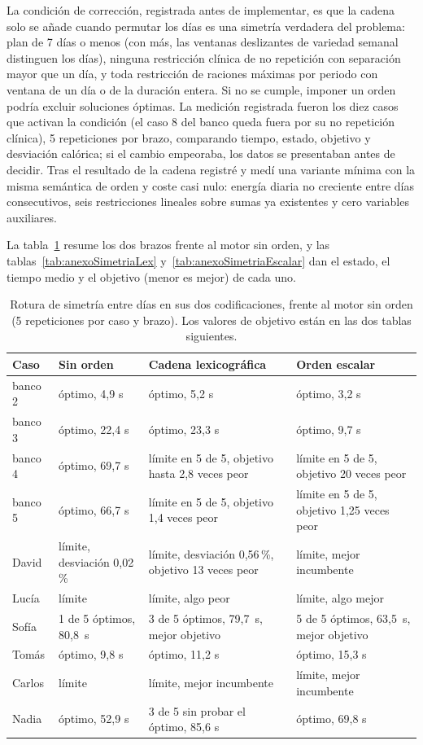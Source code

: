La condición de corrección, registrada antes de implementar, es que la cadena solo se añade cuando permutar los días es una simetría verdadera del problema: plan de 7 días o menos (con más, las ventanas deslizantes de variedad semanal distinguen los días), ninguna restricción clínica de no repetición con separación mayor que un día, y toda restricción de raciones máximas por periodo con ventana de un día o de la duración entera. Si no se cumple, imponer un orden podría excluir soluciones óptimas. La medición registrada fueron los diez casos que activan la condición (el caso 8 del banco queda fuera por su no repetición clínica), 5 repeticiones por brazo, comparando tiempo, estado, objetivo y desviación calórica; si el cambio empeoraba, los datos se presentaban antes de decidir. Tras el resultado de la cadena registré y medí una variante mínima con la misma semántica de orden y coste casi nulo: energía diaria no creciente entre días consecutivos, seis restricciones lineales sobre sumas ya existentes y cero variables auxiliares.

La tabla~\ref{tab:simetria} resume los dos brazos frente al motor sin orden, y las tablas~\ref{tab:anexoSimetriaLex} y~\ref{tab:anexoSimetriaEscalar} dan el estado, el tiempo medio y el objetivo (menor es mejor) de cada uno.

\begin{table}[htbp]
\centering
\footnotesize
\begin{tabular}{|p{1.4cm}|p{3cm}|p{4.1cm}|p{4.1cm}|}
\hline
\textbf{Caso} & \textbf{Sin orden} & \textbf{Cadena lexicográfica} & \textbf{Orden escalar} \\
\hline
banco 2 & óptimo, 4,9 s & óptimo, 5,2 s & óptimo, 3,2 s \\
\hline
banco 3 & óptimo, 22,4 s & óptimo, 23,3 s & óptimo, 9,7 s \\
\hline
banco 4 & óptimo, 69,7 s & límite en 5 de 5, objetivo hasta 2,8 veces peor & límite en 5 de 5, objetivo 20 veces peor \\
\hline
banco 5 & óptimo, 66,7 s & límite en 5 de 5, objetivo 1,4 veces peor & límite en 5 de 5, objetivo 1,25 veces peor \\
\hline
David & límite, desviación 0,02\,\% & límite, desviación 0,56\,\%, objetivo 13 veces peor & límite, mejor incumbente \\
\hline
Lucía & límite & límite, algo peor & límite, algo mejor \\
\hline
Sofía & 1 de 5 óptimos, 80,8~s & 3 de 5 óptimos, 79,7~s, mejor objetivo & 5 de 5 óptimos, 63,5~s, mejor objetivo \\
\hline
Tomás & óptimo, 9,8 s & óptimo, 11,2 s & óptimo, 15,3 s \\
\hline
Carlos & límite & límite, mejor incumbente & límite, mejor incumbente \\
\hline
Nadia & óptimo, 52,9 s & 3 de 5 sin probar el óptimo, 85,6 s & óptimo, 69,8 s \\
\hline
\end{tabular}
\caption{Rotura de simetría entre días en sus dos codificaciones, frente al motor sin orden (5 repeticiones por caso y brazo). Los valores de objetivo están en las dos tablas siguientes.}
\label{tab:simetria}
\end{table}

